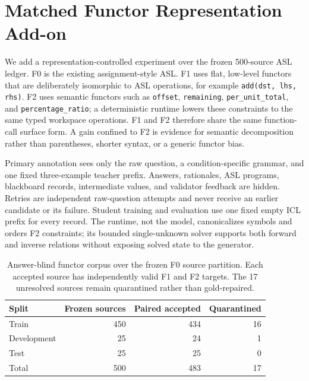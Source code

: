 \documentclass[11pt]{article}
\begin{document}
\section{Matched Functor Representation Add-on}
\label{sec:functor-addon}

We add a representation-controlled experiment over the frozen 500-source ASL
ledger. F0 is the existing assignment-style ASL. F1 uses flat, low-level
functors that are deliberately isomorphic to ASL operations, for example
\texttt{add(dst, lhs, rhs)}. F2 uses semantic functors such as
\texttt{offset}, \texttt{remaining}, \texttt{per\_unit\_total}, and
\texttt{percentage\_ratio}; a deterministic runtime lowers these constraints
to the same typed workspace operations. F1 and F2 therefore share the same
function-call surface form. A gain confined to F2 is evidence for semantic
decomposition rather than parentheses, shorter syntax, or a generic functor
bias.

Primary annotation sees only the raw question, a condition-specific grammar,
and one fixed three-example teacher prefix. Answers, rationales, ASL programs,
blackboard records, intermediate values, and validator feedback are hidden.
Retries are independent raw-question attempts and never receive an earlier
candidate or its failure. Student training and evaluation use one fixed empty
ICL prefix for every record. The runtime, not the model, canonicalizes symbols
and orders F2 constraints; its bounded single-unknown solver supports both
forward and inverse relations without exposing solved state to the generator.

\begin{table}[t]
\centering\small
\caption{Answer-blind functor corpus over the frozen F0 source partition. Each
accepted source has independently valid F1 and F2 targets. The 17 unresolved
sources remain quarantined rather than gold-repaired.}
\label{tab:functor-corpus}
\begin{tabular}{lrrr}
\toprule
Split & Frozen sources & Paired accepted & Quarantined\\
\midrule
Train & 450 & 434 & 16\\
Development & 25 & 24 & 1\\
Test & 25 & 25 & 0\\
\midrule
Total & 500 & 483 & 17\\
\bottomrule
\end{tabular}
\end{table}
\end{document}
